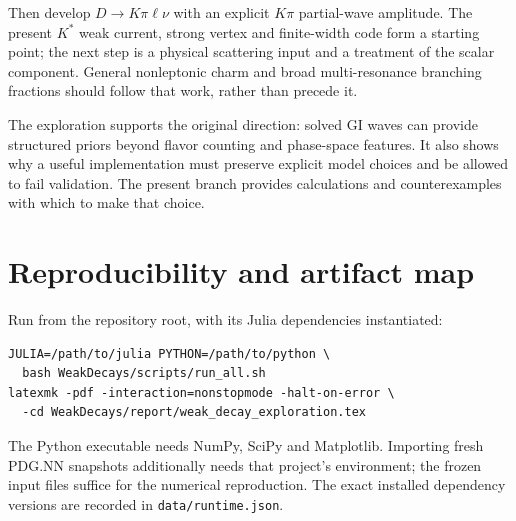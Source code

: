 \documentclass[11pt,a4paper]{article}
\begin{document}
Then develop $D\to K\pi\ell\nu$ with an explicit $K\pi$ partial-wave amplitude. The present $K^*$ weak current, strong vertex and finite-width code form a starting point; the next step is a physical scattering input and a treatment of the scalar component. General nonleptonic charm and broad multi-resonance branching fractions should follow that work, rather than precede it.

The exploration supports the original direction: solved GI waves can provide structured priors beyond flavor counting and phase-space features. It also shows why a useful implementation must preserve explicit model choices and be allowed to fail validation. The present branch provides calculations and counterexamples with which to make that choice.

\appendix
\section{Reproducibility and artifact map}
Run from the repository root, with its Julia dependencies instantiated:
\begin{verbatim}
JULIA=/path/to/julia PYTHON=/path/to/python \
  bash WeakDecays/scripts/run_all.sh
latexmk -pdf -interaction=nonstopmode -halt-on-error \
  -cd WeakDecays/report/weak_decay_exploration.tex
\end{verbatim}
The Python executable needs NumPy, SciPy and Matplotlib. Importing fresh PDG.NN snapshots additionally needs that project's environment; the frozen input files suffice for the numerical reproduction. The exact installed dependency versions are recorded in \texttt{data/runtime.json}.
\end{document}
